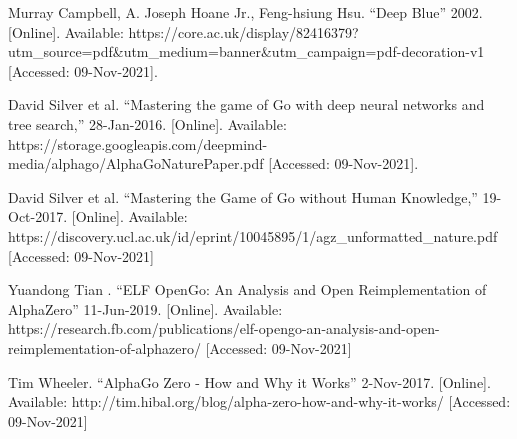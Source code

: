 \documentclass[12pt]{IEEEtran}
\begin{document}
\begin{thebibliography}{1} 
Murray Campbell, A. Joseph Hoane Jr., Feng-hsiung Hsu. “Deep Blue” 2002. [Online]. Available: https://core.ac.uk/display/82416379?utm\_source=pdf\&utm\_medium=banner\&utm\_campaign=pdf-decoration-v1 [Accessed: 09-Nov-2021]. 

David Silver et al. “Mastering the game of Go with deep neural networks and tree search,” 28-Jan-2016. [Online]. Available: https://storage.googleapis.com/deepmind-media/alphago/AlphaGoNaturePaper.pdf [Accessed: 09-Nov-2021]. 

David Silver et al. “Mastering the Game of Go without Human Knowledge,” 19-Oct-2017. [Online]. Available: https://discovery.ucl.ac.uk/id/eprint/10045895/1/agz\_unformatted\_nature.pdf [Accessed: 09-Nov-2021]

Yuandong Tian . “ELF OpenGo: An Analysis and Open Reimplementation of AlphaZero” 11-Jun-2019. [Online]. Available: https://research.fb.com/publications/elf-opengo-an-analysis-and-open-reimplementation-of-alphazero/ [Accessed: 09-Nov-2021]

Tim Wheeler. “AlphaGo Zero - How and Why it Works” 2-Nov-2017. [Online]. Available: http://tim.hibal.org/blog/alpha-zero-how-and-why-it-works/ [Accessed: 09-Nov-2021]


\end{thebibliography}
\end{document}
